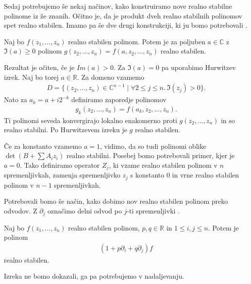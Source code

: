 Sedaj potrebujemo še nekaj načinov, kako konstruiramo nove realno stabilne polinome iz že znanih. Očitno je, da je produkt dveh realno stabilnih polinomov spet realno stabilen. Imamo pa še dve drugi konstrukciji, ki ju bomo potrebovali \cite{wagner-multivariate}.
\begin{izrek}
    Naj bo \(f(z_1, \ldots, z_n)\) realno stabilen polinom. Potem je za poljuben \(a\in \mathbb C\) z \(\Im(a)\geq 0\) polinom \(g(z_2, \ldots, z_n) = f(a, z_2, \ldots, z_n)\) realno stabilen.
\end{izrek}
\begin{dokaz}
    Rezultat je očiten, če je \(Im(a) > 0\). Za \(\Im(a) = 0\) pa uporabimo Hurwitzev izrek. Naj bo torej \(a\in \mathbb R\). Za domeno vzamemo
    \begin{align*}
        D=\{(z_2,\ldots,z_n) \in \mathbb C^{n-1}\mid \forall 2\leq j \leq n.\, \Im(z_j)> 0\}.
    \end{align*}
    Nato za \(a_k = a + i 2^{-k}\) definiramo zaporedje polinomov
    \begin{align*}
        g_k(z_2, \ldots, z_n) = f(a_k, z_2, \ldots, z_n).
    \end{align*}
    Ti polinomi seveda konvergirajo lokalno enakomerno proti \(g(z_2, \ldots, z_n)\) in so realno stabilni. Po Hurwitzevem izreku je \(g\) realno stabilen.
\end{dokaz}
Če za konstanto vzamemo \(a=1\), vidimo, da so tudi polinomi oblike \(\det(B + \sum A_i z_i)\) realno stabilni.
Posebej bomo potrebovali primer, kjer je \(a = 0\). Tako definiramo operator \(Z_j\), ki vzame realno stabilen polinom v \(n\) spremenljivkah, zamenja spremenljivko \(z_j\) s konstanto \(0\) in vrne realno stabilen polinom v \(n-1\) spremenljivkah.

Potrebovali bomo še način, kako dobimo nov realno stabilen polinom preko odvodov. Z \(\partial_j\) označimo delni odvod po \(j\)-ti spremenljivki \cite{Borcea_2010}.
\begin{izrek}
    Naj bo \(f(z_1, \ldots, z_n)\) realno stabilen polinom, \(p, q\in \mathbb R\) in \(1\leq i, j \leq n\). Potem je polinom
    \begin{align*}
        (1+p\partial_i + q\partial_j)f
    \end{align*}
    realno stabilen.
\end{izrek}
Izreka ne bomo dokazali, ga pa potrebujemo v nadaljevanju.

